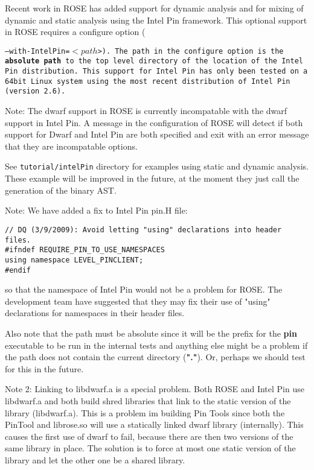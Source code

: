    Recent work in ROSE has added support for dynamic analysis and for mixing of dynamic
and static analysis using the Intel Pin framework. This optional support in ROSE
requires a configure option ({\tt --with-IntelPin=$<path$>).  The {\tt path} in
the configure option is the {\bf absolute path} to the top level directory of the location of
the Intel Pin distribution.  This support for Intel Pin has only been tested
on a 64bit Linux system using the most recent distribution of Intel Pin (version 2.6).

Note: The dwarf support in ROSE is currently incompatable with the dwarf support in
Intel Pin.  A message in the configuration of ROSE will detect if both support for
Dwarf and Intel Pin are both specified and exit with an error message that they
are incompatable options.

See {\tt tutorial/intelPin} directory for examples using static and dynamic analysis.
These example will be improved in the future, at the moment they just call the
generation of the binary AST.


Note: We have added a fix to Intel Pin pin.H file:
\begin{verbatim}
// DQ (3/9/2009): Avoid letting "using" declarations into header files.
#ifndef REQUIRE_PIN_TO_USE_NAMESPACES
using namespace LEVEL_PINCLIENT;
#endif
\end{verbatim}
so that the namespace of Intel Pin would not be a problem for ROSE.
The development team have suggested that they may fix their use of "using" 
declarations for namespaces in their header files.

Also note that the path must be absolute since it will be the
prefix for the {\bf pin} executable to be run in the internal tests and
anything else might be a problem if the path does not contain the 
current directory ({\bf "."}). Or, perhaps we should test for this
in the future.

Note 2: Linking to libdwarf.a is a special problem.  
Both ROSE and Intel Pin use libdwarf.a and both build shred libraries 
that link to the static version of the library (libdwarf.a).  This is 
a problem im building Pin Tools since both the PinTool and librose.so will use 
a statically linked dwarf library (internally).  This causes the first
use of dwarf to fail, because there are then two versions of the same 
library in place.  The solution is to force at most one static version 
of the library and let the other one be a shared library.

}
